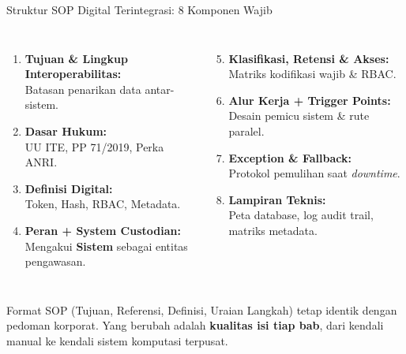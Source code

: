 \documentclass[aspectratio=169,11pt]{beamer}
\begin{document}
\begin{frame}{Struktur SOP Digital Terintegrasi: 8 Komponen Wajib}
    \vspace{0.2cm}
    \begin{columns}[T]
        \scriptsize
        \begin{enumerate}
            \item \textbf{Tujuan \& Lingkup Interoperabilitas:}\\Batasan penarikan data antar-sistem.
            \item \textbf{Dasar Hukum:}\\UU ITE, PP 71/2019, Perka ANRI.
            \item \textbf{Definisi Digital:}\\Token, Hash, RBAC, Metadata.
            \item \textbf{Peran + System Custodian:}\\Mengakui \textbf{Sistem} sebagai entitas pengawasan.
        \end{enumerate}
        
        \scriptsize
        \begin{enumerate}\setcounter{enumi}{4}
            \item \textbf{Klasifikasi, Retensi \& Akses:}\\Matriks kodifikasi wajib \& RBAC.
            \item \textbf{Alur Kerja + Trigger Points:}\\Desain pemicu sistem \& rute paralel.
            \item \textbf{Exception \& Fallback:}\\Protokol pemulihan saat \textit{downtime}.
            \item \textbf{Lampiran Teknis:}\\Peta database, log audit trail, matriks metadata.
        \end{enumerate}
    \end{columns}
    \vspace{0.2cm}
    \begin{greenbox}
        \scriptsize Format SOP (Tujuan, Referensi, Definisi, Uraian Langkah) tetap identik dengan pedoman korporat. Yang berubah adalah \textbf{kualitas isi tiap bab}, dari kendali manual ke kendali sistem komputasi terpusat.
    \end{greenbox}
\end{frame}
\end{document}
